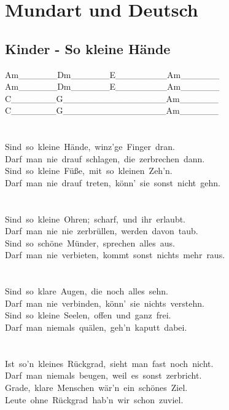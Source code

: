 \documentclass[]{book}
\let\stdsection\section
\renewcommand\section{\clearpage\stdsection}
\begin{document}
\hypertarget{mundart-und-deutsch}{%
\chapter{Mundart und Deutsch}\label{mundart-und-deutsch}}

\hypertarget{kinder---so-kleine-hande}{%
\section{Kinder - So kleine Hände}\label{kinder---so-kleine-hande}}

Am\_\_\_\_\_\_\textbar Dm\_\_\_\_\_\_\textbar E\_\_\_\_\_\_\_\_\textbar Am\_\_\_\_\_\_\textbar{}\\
Am\_\_\_\_\_\_\textbar Dm\_\_\_\_\_\_\textbar E\_\_\_\_\_\_\_\_\textbar Am\_\_\_\_\_\_\textbar{}\\
C\_\_\_\_\_\_\_\textbar G\_\_\_\_\_\_\_\textbar\_\_\_\_\_\_\_\_\_\textbar Am\_\_\_\_\_\_\textbar{}\\
C\_\_\_\_\_\_\_\textbar G\_\_\_\_\_\_\_\textbar\_\_\_\_\_\_\_\_\_\textbar Am\_\_\_\_\_\_\textbar{}\\
~\\
~\\
Sind~so~kleine~Hände,~winz'ge~Finger~dran.\\
Darf~man~nie~drauf~schlagen,~die~zerbrechen~dann.\\
Sind~so~kleine~Füße,~mit~so~kleinen~Zeh'n.\\
Darf~man~nie~drauf~treten,~könn'~sie~sonst~nicht~gehn.\\
~\\
~\\
Sind~so~kleine~Ohren;~scharf,~und~ihr~erlaubt.\\
Darf~man~nie~nie~zerbrüllen,~werden~davon~taub.\\
Sind~so~schöne~Münder,~sprechen~alles~aus.\\
Darf~man~nie~verbieten,~kommt~sonst~nichts~mehr~raus.\\
~\\
~\\
Sind~so~klare~Augen,~die~noch~alles~sehn.\\
Darf~man~nie~verbinden,~könn'~sie~nichts~verstehn.\\
Sind~so~kleine~Seelen,~offen~und~ganz~frei.\\
Darf~man~niemals~quälen,~geh'n~kaputt~dabei.\\
~\\
~\\
Ist~so'n~kleines~Rückgrad,~sieht~man~fast~noch~nicht.\\
Darf~man~niemals~beugen,~weil~es~sonst~zerbricht.\\
Grade,~klare~Menschen~wär'n~ein~schönes~Ziel.\\
Leute~ohne~Rückgrad~hab'n~wir~schon~zuviel.\\
\end{document}
